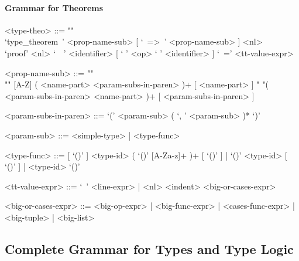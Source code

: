 \documentclass{article}
\begin{document}
\paragraph{Grammar for Theorems}

\begin{grammar}
<type-theo> ::= ""\\
`type_theorem\ ' <prop-name-sub> [ `\ =>\ ' <prop-name-sub> ] <nl> \\
`proof' <nl> `\ \ ' <identifier> [ ` ' <op> ` ' <identifier> ] `\ =' <tt-value-expr>

<prop-name-sub> ::=  ""\\""
[A-Z] ( <name-part> <param-subs-in-paren> )+ [ <name-part> ]
\alt " "( <param-subs-in-paren> <name-part> )+ [ <param-subs-in-paren> ]

<param-subs-in-paren> ::= `(' <param-sub> ( `, ' <param-sub> )* `)'

<param-sub> ::= <simple-type> | <type-func>

<type-func> ::=
[ `()' ] <type-id> ( `()' [A-Za-z]+ )+ [ `()' ] | `()' <type-id> [ `()' ] |
<type-id> `()'

<tt-value-expr> ::= `\ ' <line-expr> | <nl> <indent> <big-or-cases-expr>

<big-or-cases-expr> ::=
<big-op-expr> | <big-func-expr> | <cases-func-expr> | <big-tuple> | <big-list>
\end{grammar} 

\subsection{Complete Grammar for Types and Type Logic}
\end{document}
